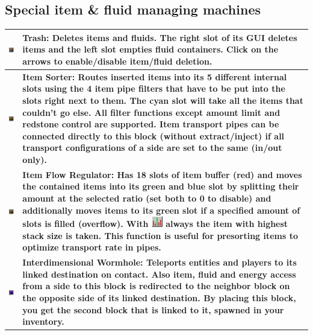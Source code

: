 \documentclass[11pt]{article} %
\makeatletter
\newcommand{\imgtex}{\begin{tabularx}{\textwidth}{@{}c@{ }X@{}}}
\makeatother
\begin{document}
\subsection{Special item \& fluid managing machines}
\imgtex \hline
\includegraphics[align = t]{blockTrash} & \bf Trash: \rm Deletes items and fluids. The right slot of its GUI deletes items and the left slot empties fluid containers. Click on the arrows to enable/disable item/fluid deletion. \\ \hline
\includegraphics[align = t]{blockSorter} & \bf Item Sorter: \rm Routes inserted items into its 5 different internal slots using the 4 item pipe filters that have to be put into the slots right next to them. The cyan slot will take all the items that couldn't go else. All filter functions except amount limit and redstone control are supported. \bf Item transport pipes \rm can be connected directly to this block (without extract/inject) if all transport configurations of a side are set to the same (in/out only).\\ \hline
\includegraphics[align = t]{blockRegulator} & \bf Item Flow Regulator: \rm Has 18 slots of item buffer (red) and moves the contained items into its green and blue slot by splitting their amount at the selected ratio (set both to 0 to disable) and additionally moves items to its green slot if a specified amount of slots is filled (overflow). With \includegraphics[align = c]{bigStackFirst} always the item with highest stack size is taken. This function is useful for presorting items to optimize transport rate in pipes.\\ \hline
\includegraphics[align = t]{blockInterdim} & \bf Interdimensional Wormhole: \rm Teleports entities and players to its linked destination on contact. Also item, fluid and energy access from a side to this block is redirected to the neighbor block on the opposite side of its linked destination. By placing this block, you get the second block that is linked to it, spawned in your inventory. \\ \hline
\end{tabularx}
\end{document}
